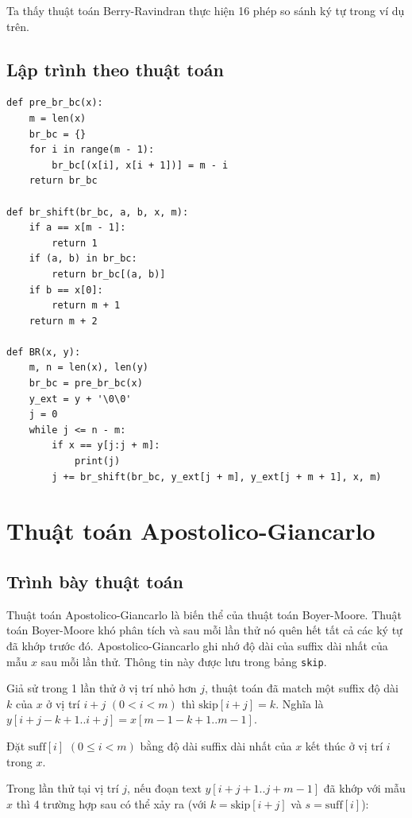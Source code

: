 \documentclass[12pt,twoside,openright]{extreport}
\begin{document}
Ta thấy thuật toán Berry-Ravindran thực hiện 16 phép so sánh ký tự trong ví dụ trên.

\subsection{Lập trình theo thuật toán}

\begin{lstlisting}[style=PythonStyle]
def pre_br_bc(x):
    m = len(x)
    br_bc = {}
    for i in range(m - 1):
        br_bc[(x[i], x[i + 1])] = m - i
    return br_bc

def br_shift(br_bc, a, b, x, m):
    if a == x[m - 1]:
        return 1
    if (a, b) in br_bc:
        return br_bc[(a, b)]
    if b == x[0]:
        return m + 1
    return m + 2

def BR(x, y):
    m, n = len(x), len(y)
    br_bc = pre_br_bc(x)
    y_ext = y + '\0\0'
    j = 0
    while j <= n - m:
        if x == y[j:j + m]:
            print(j)
        j += br_shift(br_bc, y_ext[j + m], y_ext[j + m + 1], x, m)
\end{lstlisting}

\section{Thuật toán Apostolico-Giancarlo}

\subsection{Trình bày thuật toán}

Thuật toán Apostolico-Giancarlo là biến thể của thuật toán Boyer-Moore. Thuật toán Boyer-Moore khó phân tích và sau mỗi lần thử nó quên hết tất cả các ký tự đã khớp trước đó. Apostolico-Giancarlo ghi nhớ độ dài của suffix dài nhất của mẫu $x$ sau mỗi lần thử. Thông tin này được lưu trong bảng \texttt{skip}.

Giả sử trong 1 lần thử ở vị trí nhỏ hơn $j$, thuật toán đã match một suffix độ dài $k$ của $x$ ở vị trí $i + j$ $(0 < i < m)$ thì $\text{skip}[i+j] = k$. Nghĩa là $y[i+j-k+1..i+j] = x[m-1-k+1..m-1]$.

Đặt $\text{suff}[i]$ $(0 \leq i < m)$ bằng độ dài suffix dài nhất của $x$ kết thúc ở vị trí $i$ trong $x$.

Trong lần thử tại vị trí $j$, nếu đoạn text $y[i+j+1..j+m-1]$ đã khớp với mẫu $x$ thì 4 trường hợp sau có thể xảy ra (với $k = \text{skip}[i+j]$ và $s = \text{suff}[i]$):
\end{document}
